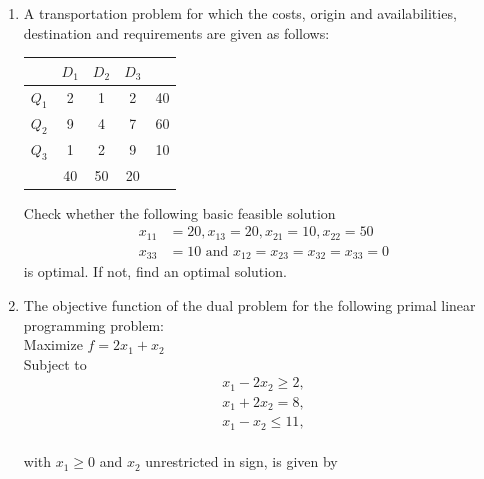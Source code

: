 \documentclass[journal,12pt,twocolumn]{IEEEtran}
\begin{document}
\title{
}

\maketitle

\begin{enumerate}
\setlength\itemsep{1em}

\item A transportation problem for which the costs, origin and availabilities, destination and requirements are given as follows:\\
\bigskip

\begin{center}
\begin{tabular}{c|c c c|c}
 & $D_1$ & $D_2$ & $D_3$\\ \hline
$Q_1$ & 2 & 1 & 2 & 40\\
$Q_2$ & 9 & 4 & 7 & 60\\
$Q_3$ & 1 & 2 & 9 & 10\\ \hline
 & 40 & 50 & 20\\
\end{tabular}
\end{center}
\bigskip
Check whether the following basic feasible solution
\begin{align*}
x_{11}&=20,x_{13}=20,x_{21}=10,x_{22}=50
\\
x_{33}&=10 \text{ and } x_{12}=x_{23}=x_{32}=x_{33}=0
\end{align*}
is optimal. If not, find an optimal solution.
%
\item The objective function of the dual problem for the following primal linear programming problem: \\ \medskip
Maximize $f=2x_1\!+\!x_2$\\ \medskip
Subject to
\begin{align*}
x_1\!-\!2x_2\! \geqslant\! 2, \\ 
x_1\!+\!2x_2\!=\!8,\\
x_1\!-\!x_2\! \leqslant \! 11,
\end{align*} \\
with $x_1\! \geqslant\!0$ and $x_2$ unrestricted in sign, is given by
%
\begin{enumerate}[(A)]
\end{enumerate}
\end{enumerate}
\end{document}

